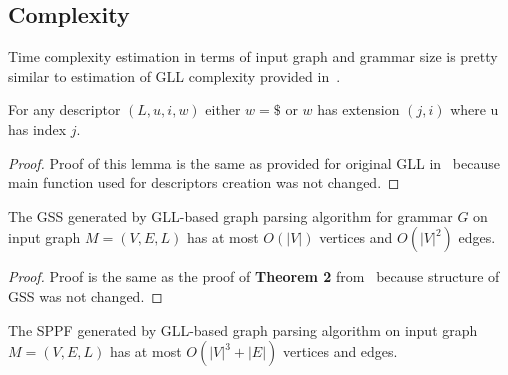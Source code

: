 \subsection{Complexity}

Time complexity estimation in terms of input graph and grammar size is pretty similar to estimation of GLL complexity provided in~\cite{gllParsingTree}.

\begin{lemma}\label{lem:Descriptors}
For any descriptor $(L,u,i,w)$ either $w = \$$ or $w$ has extension $(j,i)$ where u has index $j$.
\end{lemma}
\begin{proof}
Proof of this lemma is the same as provided for original GLL in~\cite{gllParsingTree} because main function used for descriptors creation was not changed.
\end{proof}


\begin{mytheorem}\label{thm:GSSSpace}
The GSS generated by GLL-based graph parsing algorithm for grammar $G$ on input graph $M=(V,E,L)$ has at most $O(|V|)$ vertices and $O(|V|^2)$ edges.
\end{mytheorem}

\begin{proof}

Proof is the same as the proof of \textbf{Theorem 2} from~\cite{gllParsingTree} because structure of GSS was not changed. 

\end{proof}

\begin{mytheorem}\label{thm:SPPFSpace}
The SPPF generated by GLL-based graph parsing algorithm on input graph $M=(V,E,L)$ has at most $O(|V|^3 + |E|)$ vertices and edges.
\end{mytheorem}


